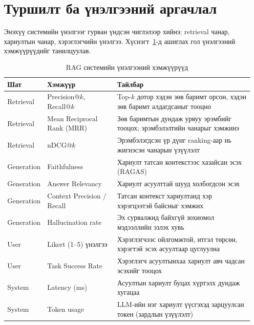 
\section{Туршилт ба үнэлгээний аргачлал}

Энэхүү системийн үнэлгээг гурван үндсэн чиглэлээр хийнэ: retrieval чанар, хариултын чанар, хэрэглэгчийн үнэлгээ. Хүснэгт~\ref{tab:eval-metrics}-д ашиглах гол үнэлгээний хэмжүүрүүдийг танилцуулав.


\begin{table}[H]
\centering
\begin{tabular}{|p{2.4cm}|p{4.0cm}|p{7.5cm}|}
\hline
\textbf{Шат} & \textbf{Хэмжүүр} & \textbf{Тайлбар} \\ \hline
Retrieval & Precision@$k$, Recall@$k$~\cite{dpr} & Top-$k$ дотор хэдэн зөв баримт орсон, хэдэн зөв баримт алдагдсаныг тооцно \\ \hline
Retrieval & Mean Reciprocal Rank (MRR) & Зөв баримтын дундаж урвуу эрэмбийг тооцох; эрэмбэлэлтийн чанарыг хэмжинэ \\ \hline
Retrieval & nDCG@$k$ & Эрэмбэлэгдсэн үр дүнг ranking-аар нь жигнэсэн чанарын үзүүлэлт \\ \hline
Generation & Faithfulness~\cite{ragas} & Хариулт татсан контекстээс хазайсан эсэх (RAGAS) \\ \hline
Generation & Answer Relevancy~\cite{ragas} & Хариулт асуулттай шууд холбогдсон эсэх \\ \hline
Generation & Context Precision / Recall~\cite{ragas} & Татсан контекст хариултанд хэр хэрэгцээтэй байсныг хэмжих \\ \hline
Generation & Hallucination rate~\cite{hallucination_survey,ji_hallucination_survey} & Эх сурвалжид байхгүй зохиомол мэдээллийн эзлэх хувь \\ \hline
User & Likert (1--5) үнэлгээ & Хэрэглэгчээс ойлгомжтой, итгэл төрсөн, хэрэгтэй эсэх асуултаар цуглуулна \\ \hline
User & Task Success Rate & Хэрэглэгч асуултынхаа хариулт авч чадсан эсэхийг тооцох \\ \hline
System & Latency (ms) & Асуултын хариулт буцах хүртэлх дундаж хугацаа \\ \hline
System & Token usage & LLM-ийн нэг хариулт үүсгэхэд зарцуулсан токен (зардлын үзүүлэлт) \\ \hline
\end{tabular}
\caption[RAG системийн үнэлгээний хэмжүүрүүд]{RAG системийн үнэлгээний хэмжүүрүүд}
\label{tab:eval-metrics}
\end{table}


